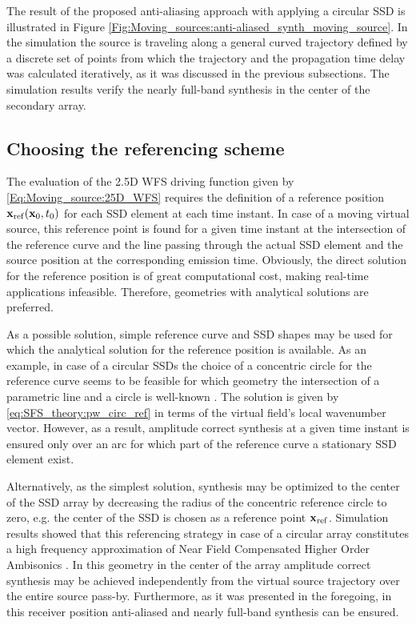The result of the proposed anti-aliasing approach with applying a circular SSD is illustrated in Figure \ref{Fig:Moving_sources:anti-aliased_synth_moving_source}.
In the simulation the source is traveling along a general curved trajectory defined by a discrete set of points from which the trajectory and the propagation time delay was calculated iteratively, as it was discussed in the previous subsections.
The simulation results verify the nearly full-band synthesis in the center of the secondary array.

\subsection{Choosing the referencing scheme}
The evaluation of the 2.5D WFS driving function given by \eqref{Eq:Moving_source:25D_WFS} requires the definition of a reference position $\mathbf{x}_{\mathrm{ref}}(\mathbf{x}_0,t_0)$ for each SSD element at each time instant.
In case of a moving virtual source, this reference point is found for a given time instant at the intersection of the reference curve and the line passing through the actual SSD element and the source position at the corresponding emission time.
Obviously, the direct solution for the reference position is of great computational cost, making real-time applications infeasible. 
Therefore, geometries with analytical solutions are preferred.

As a possible solution, simple reference curve and SSD shapes may be used for which the analytical solution for the reference position is available.
As an example, in case of a circular SSDs the choice of a concentric circle for the reference curve seems to be feasible for which geometry the intersection of a parametric line and a circle is well-known \cite[Ch.7.3.2]{Schneider2003:ComputerGraphics}.
The solution is given by \eqref{eq:SFS_theory:pw_circ_ref} in terms of the virtual field's local wavenumber vector.
However, as a result, amplitude correct synthesis at a given time instant is ensured only over an arc for which part of the reference curve a stationary SSD element exist.

Alternatively, as the simplest solution, synthesis may be optimized to the center of the SSD array by decreasing the radius of the concentric reference circle to zero, e.g. the center of the SSD is chosen as a reference point $\mathbf{x}_{\mathrm{ref}}$.
Simulation results showed that this referencing strategy in case of a circular array constitutes a high frequency approximation of Near Field Compensated Higher Order Ambisonics \cite{Schultz2019:HOA_vs_WFS}.
In this geometry in the center of the array amplitude correct synthesis may be achieved independently from the virtual source trajectory over the entire source pass-by.
Furthermore, as it was presented in the foregoing, in this receiver position anti-aliased and nearly full-band synthesis can be ensured.